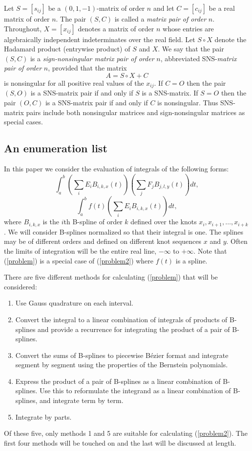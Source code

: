 \documentclass[slovensky]{svk}
\begin{document}
Let $S=[s_{ij}]$ be a $(0,1,-1)$-matrix of order $n$ and
let $C=[c_{ij}]$ be a real matrix of order $n$. The pair
$(S,C)$ is called a {\em matrix pair of order} $n$.
Throughout, $X=[x_{ij}]$ denotes a matrix of order $n$
whose entries are algebraically independent indeterminates
over the real field. Let $S\circ X$ denote the Hadamard
product (entrywise product) of $S$ and $X$. We say that the
pair $(S,C)$ is a {\em sign-nonsingular matrix pair of
order} $n$, abbreviated SNS-{\em matrix pair of order} $n$,
provided that the matrix \[A=S\circ X+C\] is nonsingular
for all positive real values of the $x_{ij}$.  If $C=O$
then the pair $(S,O)$ is a SNS-matrix pair if and only if
$S$ is a SNS-matrix.  If $S=O$ then the pair $(O,C)$ is a
SNS-matrix pair if and only if $C$ is nonsingular. Thus
SNS-matrix pairs include both nonsingular matrices and
sign-nonsingular matrices as special cases.
 
\subsection{An enumeration list}
In this paper we consider the evaluation of integrals of the 
following forms:
\begin{equation}
\int_a^b \left( \sum_i E_i B_{i,k,x}(t) \right)
         \left( \sum_j F_j B_{j,l,y}(t) \right) dt,\label{problem}
\end{equation}
\begin{equation}
\int_a^b f(t) \left( \sum_i E_i B_{i,k,x}(t) \right) dt,\label{problem2}
\end{equation}
where $B_{i,k,x}$ is the $i$th B-spline of order $k$ defined over the
knots $x_i, x_{i+1}, \ldots, x_{i+k}$.
We will consider B-splines normalized so that their integral is one.
The splines may be of different orders and
defined on different knot sequences $x$ and $y$.
Often the limits of integration will be the entire real line, $-\infty$
to $+\infty$. Note that (\ref{problem}) is a special case of (\ref{problem2})
where $f(t)$ is a spline.


There are five different methods for calculating (\ref{problem})
that will be considered:
\begin{enumerate}
\item Use Gauss quadrature on each interval.
\item Convert the integral to a linear combination of
      integrals of products of B-splines and provide a recurrence for
      integrating the product of a pair of B-splines.
\item Convert the sums of B-splines to piecewise
      B\'{e}zier format and integrate segment
      by segment using the properties of the Bernstein polynomials.
\item Express the product of a pair of B-splines as a linear combination
      of B-splines.
      Use this to reformulate the integrand as a linear combination
      of B-splines, and integrate term by term.
\item Integrate by parts.
\end{enumerate}
Of these five, only methods 1 and 5 are suitable for calculating 
(\ref{problem2}). The first four methods will be touched on and the 
last will be discussed at length.
\end{document}
